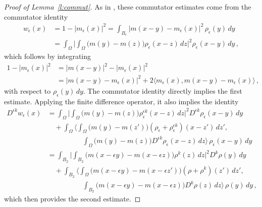 \documentclass[fleqn
]{article}
\numberwithin{equation}{section}
\newcommand{\e}{\epsilon}
\theoremstyle{definition}
\begin{document}
\begin{proof}[Proof of Lemma~\ref{l:commut}]
As in \cite{DeI}, these commutator estimates come from the commutator identity
\begin{align*}
w_\e(x)
&
= 1-|m_\e(x)|^2
=\int_{B_\e} |m(x- y)-m_\e(x)|^2\, \rho_\e(y)\,dy
\\
&
=\int_{\Omega} \bigg| \int_{\Omega} \big(m(y)-m( z)\big)
\rho_\e(x-z)\,dz
\bigg|^2\rho_\e(x-y)\,dy\,,
\end{align*}
which follows by integrating
\begin{align*}
1-|m_\e(x)|^2
&
=|m(x- y)|^2 -|m_\e(x)|^2
\\
&
=|m(x- y)-m_\e(x)|^2 + 2 \langle m_\e(x),m(x- y)-m_\e(x)\rangle\,,
\end{align*}
with respect to $\rho_\e(y)\, dy$.
The commutator identity directly implies the first estimate.
Applying the finite difference operator,
 it also
 implies the identity
\begin{align*}
D^{\e k}w_\e(x)
&
=
\int_{\Omega} \bigg| \int_{\Omega} \big(m(y)-m( z)\big)
\rho_\e^{\e k}(x-z)\,dz
\bigg|^2D^{\e k}\rho_\e(x-y)\,dy
\\
&
\quad
+ \int_{\Omega}
\Big\langle \int_{\Omega}\big(m(y)-m( z')\big)
(\rho_\e+\rho_\e^{\e k})(x-z')\,dz'
,
\\
&
\hspace{5em}
\int_{\Omega}\big(m(y)-m( z)\big)
D^{\e k}\rho_\e(x-z)\,dz
\Big\rangle
\,\rho_\e(x-y)\, dy\,
\\
&
=
\int_{B_2} \bigg| \int_{B_2} \big(m(x-\e y)-m( x-\e z)\big)
\rho^{k}(z)\,dz
\bigg|^2D^{k}\rho(y)\,dy
\\
&
\quad
+ \int_{B_2}
\Big\langle \int_{\Omega}\big(m(x-\e y)-m( x-\e z')\big)
(\rho +\rho^{ k})(z')\,dz'
,
\\
&
\hspace{5em}
\int_{B_2}\big(m(x-\e y)-m(x-\e z)\big)
D^{k}\rho( z)\,dz
\Big\rangle
\,\rho ( y)\, dy\,,
\end{align*}
which then provides the second estimate.
\end{proof}
\end{document}

